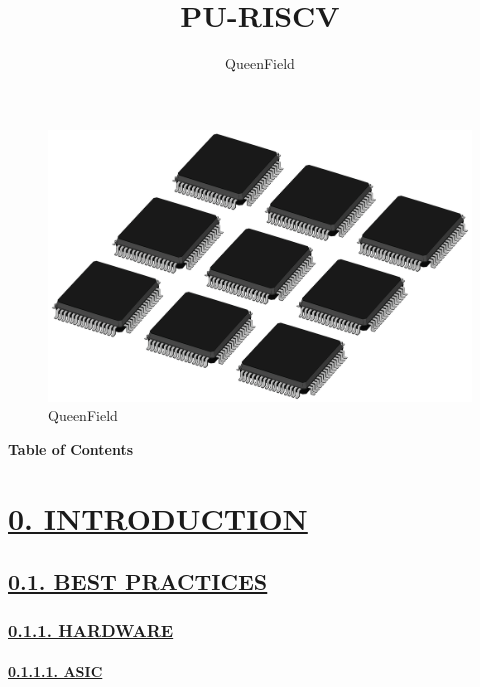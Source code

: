 \documentclass[
]{article}
\title{PU-RISCV}
\author{QueenField}
\date{}
\begin{document}
\maketitle

\begin{figure}
\centering
\includegraphics{../icon.jpg}
\caption{QueenField}
\end{figure}

\textbf{Table of Contents}

\hypertarget{introduction}{%
\section{\texorpdfstring{\protect\hyperlink{introduction-1}{0.
INTRODUCTION}}{0. INTRODUCTION}}\label{introduction}}

\hypertarget{best-practices}{%
\subsection{\texorpdfstring{\protect\hyperlink{best-practices-1}{0.1.
BEST PRACTICES}}{0.1. BEST PRACTICES}}\label{best-practices}}

\hypertarget{hardware}{%
\subsubsection{\texorpdfstring{\protect\hyperlink{hardware-1}{0.1.1.
HARDWARE}}{0.1.1. HARDWARE}}\label{hardware}}

\hypertarget{asic}{%
\paragraph{\texorpdfstring{\protect\hyperlink{asic-1}{0.1.1.1.
ASIC}}{0.1.1.1. ASIC}}\label{asic}}
\end{document}
